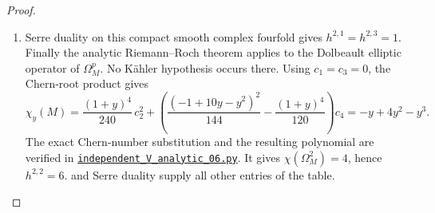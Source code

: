 \begin{proof}
\begin{enumerate}[label={$\langle1\rangle$\arabic*.}]
\item Serre duality \cite[Theorem 4, p.~22]{Serre1955Duality} on this compact smooth complex fourfold gives
$h^{2,1}=h^{2,3}=1$. Finally the analytic Riemann--Roch theorem
\cite[Theorem 25.3.1, p.~187; \S25.4(a), pp.~188--190]{HirzebruchTopologicalMethods} applies to the Dolbeault elliptic
operator of $\Omega_M^p$. No Kähler hypothesis occurs there.
Using $c_1=c_3=0$, the Chern-root product gives
\[
\chi_y(M)=
\frac{(1+y)^4}{240}\,c_2^2+
\left(\frac{(-1+10y-y^2)^2}{144}
       -\frac{(1+y)^4}{120}\right)c_4
=-y+4y^2-y^3.
\]
The exact Chern-number substitution and the resulting polynomial are
verified in \href{https://github.com/KokunoYumeto/s6-complex-structure-workbench/blob/83d76022bcd442278b760db9ff438afceed6c6ea/pro_returns/S6_SERIES_GRIND_checkpoint_10_20261120T0211Z/code/current_audits/audit_corrections/code/independent_V_analytic_06.py}{\texttt{independent\_V\_analytic\_06.py}}. It gives
$\chi(\Omega_M^2)=4$, hence $h^{2,2}=6$.
 and Serre duality supply all other entries of the table.

\end{enumerate}
\end{proof}




